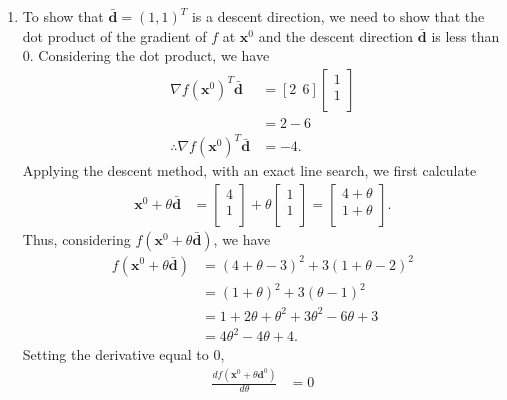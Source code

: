 \documentclass[a4paper,11pt]{article}
\newcommand{\ds}{\displaystyle}
\begin{document}
{{\begin{enumerate}[leftmargin=*]
\begin{enumerate}[label=\alph*)]
				\item To show that $\ds{\bar{\mathbf{d}} = (1,1)^T}$ is a descent direction, we need to show that the dot product of the gradient of $\ds{f}$ at $\ds{\mathbf{x}^0}$ and the descent direction $\ds{\bar{\mathbf{d}}}$ is less than 0. Considering the dot product, we have
					\begin{align*}
						\nabla f\left(\mathbf{x}^0\right)^T\bar{\mathbf{d}} & = [2\:\: 6]
						\begin{bmatrix}
							1 \\
							1 \\
						\end{bmatrix} \\
						& = 2 - 6 \\
						\therefore \nabla f\left(\mathbf{x}^0\right)^T\bar{\mathbf{d}} & = -4.
					\end{align*}
					Applying the descent method, with an exact line search, we first calculate 
					\begin{align*}
						\mathbf{x}^0 + \theta \bar{\mathbf{d}} & =
						\begin{bmatrix}
							4 \\
							1 \\
						\end{bmatrix} + \theta
						\begin{bmatrix}
							1 \\
							1 \\
						\end{bmatrix} =
						\begin{bmatrix}
							4 + \theta \\
							1 + \theta \\
						\end{bmatrix}.
					\end{align*}
					Thus, considering $\ds{f\left(\mathbf{x}^0 + \theta \bar{\mathbf{d}}\right)}$, we have
					\begin{align*}
						f\left(\mathbf{x}^0 + \theta \bar{\mathbf{d}}\right) & = (4+\theta-3)^2 + 3(1+\theta-2)^2 \\
																		 & = (1+\theta)^2 + 3(\theta-1)^2 \\
																		 & = 1 + 2\theta + \theta^2 + 3\theta^2 - 6\theta + 3 \\
																		 & = 4\theta^2 - 4\theta + 4.
					\end{align*}
					Setting the derivative equal to 0,
					\begin{align*}
						\frac{df\left(\mathbf{x}^0 + \theta \mathbf{d}^0\right)}{d\theta} & = 0 \\

\end{align*}
\end{enumerate}
\end{enumerate}}}
\end{document}

